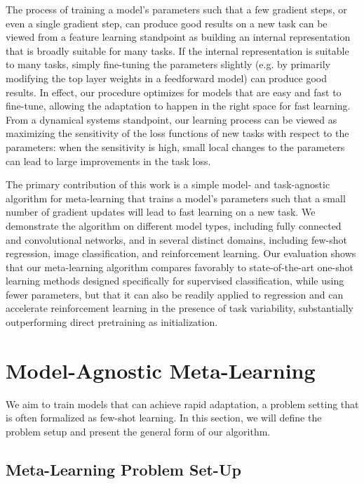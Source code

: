 \documentclass{article}
\begin{document}
The process of training a model's parameters such that a few gradient steps, or even a single gradient step, can produce good results on a new task can be viewed from a feature learning standpoint as building an internal representation that is broadly suitable for many tasks. If the internal representation is suitable to many tasks, simply fine-tuning the parameters slightly (e.g. by primarily modifying the top layer weights in a feedforward model) can produce good results. In effect, our procedure optimizes for models that are easy and fast to fine-tune, allowing the adaptation to happen in the right space for fast learning. From a dynamical systems standpoint, our learning process can be viewed as maximizing the sensitivity of the loss functions of new tasks with respect to the parameters: when the sensitivity is high, small local changes to the parameters can lead to large improvements in the task loss.

The primary contribution of this work is a simple model- and task-agnostic algorithm for meta-learning that trains a model's parameters such that a small number of gradient updates will lead to fast learning on a new task.
We demonstrate the algorithm on different model types, including fully connected and convolutional networks, and in several distinct domains, including few-shot regression, image classification, and reinforcement learning.
Our evaluation shows that our meta-learning algorithm compares favorably to state-of-the-art one-shot learning methods designed specifically for supervised classification, while using fewer parameters, but that it can also be readily applied to regression and can accelerate reinforcement learning in the presence of task variability, substantially outperforming direct pretraining as initialization.


\section{Model-Agnostic Meta-Learning}
\label{sec:overview}

We aim to train models that can achieve rapid adaptation, a problem setting that is often formalized as few-shot learning. In this section, we will define the problem setup and present the general form of our algorithm.



\subsection{Meta-Learning Problem Set-Up}
\label{sec:problem}
\end{document}
